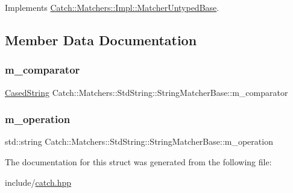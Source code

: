 Implements \mbox{\hyperlink{class_catch_1_1_matchers_1_1_impl_1_1_matcher_untyped_base_a91d3a907dbfcbb596077df24f6e11fe2}{Catch\+::\+Matchers\+::\+Impl\+::\+Matcher\+Untyped\+Base}}.



\subsection{Member Data Documentation}
\mbox{\label{struct_catch_1_1_matchers_1_1_std_string_1_1_string_matcher_base_a17c9f0fe40587070ffe998c193742831}} 
\subsubsection{\texorpdfstring{m\_comparator}{m\_comparator}}
{\footnotesize\ttfamily \mbox{\hyperlink{struct_catch_1_1_matchers_1_1_std_string_1_1_cased_string}{Cased\+String}} Catch\+::\+Matchers\+::\+Std\+String\+::\+String\+Matcher\+Base\+::m\+\_\+comparator}

\mbox{\label{struct_catch_1_1_matchers_1_1_std_string_1_1_string_matcher_base_a7a25c4b7d863e9a1c406d81efd0f83ca}} 
\subsubsection{\texorpdfstring{m\_operation}{m\_operation}}
{\footnotesize\ttfamily std\+::string Catch\+::\+Matchers\+::\+Std\+String\+::\+String\+Matcher\+Base\+::m\+\_\+operation}



The documentation for this struct was generated from the following file\+:\begin{DoxyCompactItemize}
\item 
include/\mbox{\hyperlink{catch_8hpp}{catch.\+hpp}}\end{DoxyCompactItemize}

